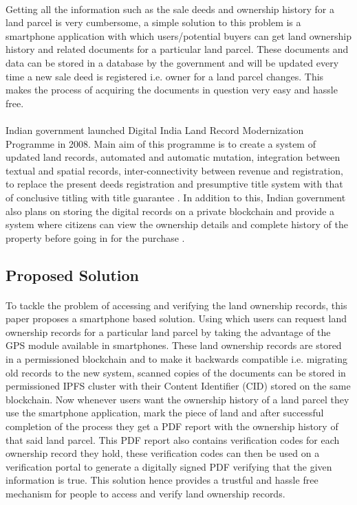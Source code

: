\documentclass{article}
\begin{document}
        \paragraph{}
        Getting all the information such as the sale deeds and ownership history for a land parcel is very cumbersome, a simple solution to this problem is a smartphone application with which users/potential buyers can get land ownership history and related documents for a particular land parcel. These documents and data can be stored in a database by the government and will be updated every time a new sale deed is registered i.e. owner for a land parcel changes. This makes the process of acquiring the documents in question very easy and hassle free.

        \paragraph{}
        Indian government launched Digital India Land Record Modernization Programme in 2008. Main aim of this programme is to create a system of updated land records, automated and automatic mutation, integration between textual and spatial records, inter-connectivity between revenue and registration, to replace the present deeds registration and presumptive title system with that of conclusive titling with title guarantee \cite{dilrmp}. In addition to this, Indian government also plans on storing the digital records on a private blockchain and provide a system where citizens can view the ownership details and complete history of the property before going in for the purchase \cite{blockchaingovin}.  

    \subsection{Proposed Solution}
        \paragraph{}
        To tackle the problem of accessing and verifying the land ownership records, this paper proposes a smartphone based solution. Using which users can request land ownership records for a particular land parcel by taking the advantage of the GPS module available in smartphones. These land ownership records are stored in a permissioned blockchain and to make it backwards compatible i.e. migrating old records to the new system, scanned copies of the documents can be stored in permissioned IPFS cluster with their Content Identifier (CID) stored on the same blockchain. Now whenever users want the ownership history of a land parcel they use the smartphone application, mark the piece of land and after successful completion of the process they get a PDF report with the ownership history of that said land parcel. This PDF report also contains verification codes for each ownership record they hold, these verification codes can then be used on a verification portal to generate a digitally signed PDF verifying that the given information is true. This solution hence provides a trustful and hassle free mechanism for people to access and verify land ownership records.
\end{document}
